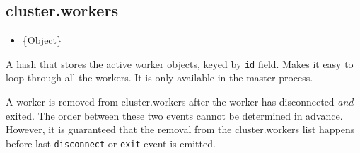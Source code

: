 \begin{Shaded}
\begin{Highlighting}[]
 \NormalTok{(}\NormalTok{);}

 \NormalTok{(}\NormalTok{) \{}
  \NormalTok{(}\NormalTok{);}
  \NormalTok{();}
  \NormalTok{();}
\NormalTok{\} }  \NormalTok{(}\NormalTok{) \{}
  \NormalTok{(} \NormalTok{+ }\NormalTok{);}
\NormalTok{\}}
\end{Highlighting}
\end{Shaded}

\subsection{cluster.workers}\label{cluster.workers}

\begin{itemize}
\itemsep1pt\parskip0pt
\item
  \{Object\}
\end{itemize}

A hash that stores the active worker objects, keyed by \texttt{id}
field. Makes it easy to loop through all the workers. It is only
available in the master process.

A worker is removed from cluster.workers after the worker has
disconnected \emph{and} exited. The order between these two events
cannot be determined in advance. However, it is guaranteed that the
removal from the cluster.workers list happens before last
\texttt{\textquotesingle{}disconnect\textquotesingle{}} or
\texttt{\textquotesingle{}exit\textquotesingle{}} event is emitted.

\begin{Shaded}
\begin{Highlighting}[]
 
   \NormalTok{(}  \NormalTok{) \{}
    \NormalTok{(}\NormalTok{[id]);}
  \NormalTok{\}}
\NormalTok{\}}
\NormalTok{(}
  \NormalTok{(}\NormalTok{);}
\NormalTok{\});}
\end{Highlighting}
\end{Shaded}


